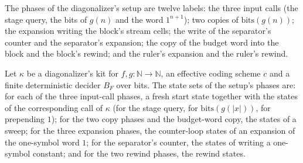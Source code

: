 \begin{definition}
\label{Turing.NTimeDiag.DzPK}
\leanok
The phases of the diagonalizer's setup are twelve labels: the three input calls (the stage query, the bits of $g(n)$ and the word $1^{n+1}$); two copies of $\mathrm{bits}(g(n))$; the expansion writing the block's stream cells; the write of the separator's counter and the separator's expansion; the copy of the budget word into the block and the block's rewind; and the ruler's expansion and the ruler's rewind.
\end{definition}

\begin{definition}
\label{Turing.NTimeDiag.DzPPh}
\leanok
{}
Let $\kappa$ be a diagonalizer's kit for $f, g : \mathbb{N} \to \mathbb{N}$, an effective coding scheme $c$ and a finite deterministic decider $B_F$ over bits. The state sets of the setup's phases are: for each of the three input-call phases, a fresh start state together with the states of the corresponding call of $\kappa$ (for the stage query, for $\mathrm{bits}(g(|x|))$, for prepending $1$); for the two copy phases and the budget-word copy, the states of a sweep; for the three expansion phases, the counter-loop states of an expansion of the one-symbol word $1$; for the separator's counter, the states of writing a one-symbol constant; and for the two rewind phases, the rewind states.
\end{definition}


